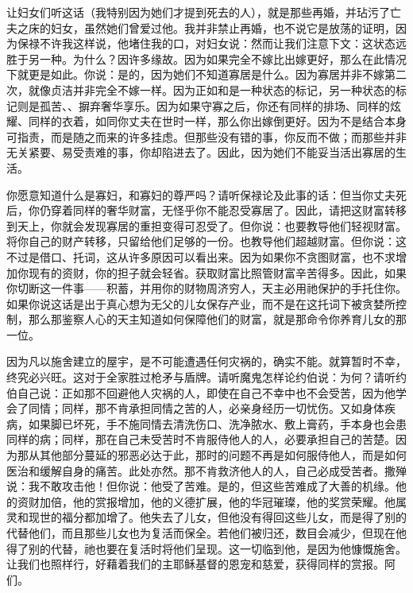 让妇女们听这话（我特别因为她们才提到死去的人），就是那些再婚，并玷污了亡夫之床的妇女，虽然她们曾爱过他。我并非禁止再婚，也不说它是放荡的证明，因为保禄不许我这样说，他堵住我的口，对妇女说：然而让我们注意下文：这状态远胜于另一种。为什么？因许多缘故。因为如果完全不嫁比出嫁更好，那么在此情况下就更是如此。你说：是的，因为她们不知道寡居是什么。因为寡居并非不嫁第二次，就像贞洁并非完全不嫁一样。因为正如和是一种状态的标记，另一种状态的标记则是孤苦、、摒弃奢华享乐。因为如果守寡之后，你还有同样的排场、同样的炫耀、同样的衣着，如同你丈夫在世时一样，那么你出嫁倒更好。因为不是结合本身可指责，而是随之而来的许多挂虑。但那些没有错的事，你反而不做；而那些并非无关紧要、易受责难的事，你却陷进去了。因此，因为她们不能妥当活出寡居的生活。\par

你愿意知道什么是寡妇，和寡妇的尊严吗？请听保禄论及此事的话：但当你丈夫死后，你仍穿着同样的奢华财富，无怪乎你不能忍受寡居了。因此，请把这财富转移到天上，你就会发现寡居的重担变得可忍受了。但你说：也要教导他们轻视财富。将你自己的财产转移，只留给他们足够的一份。也教导他们超越财富。但你说：这不过是借口、托词，这从许多原因可以看出来。因为如果你不贪图财富，也不求增加你现有的资财，你的担子就会轻省。获取财富比照管财富辛苦得多。因此，如果你切断这一件事——积蓄，并用你的财物周济穷人，天主必用祂保护的手托住你。如果你说这话是出于真心想为无父的儿女保存产业，而不是在这托词下被贪婪所控制，那么那鉴察人心的天主知道如何保障他们的财富，就是那命令你养育儿女的那一位。\par

因为凡以施舍建立的屋宇，是不可能遭遇任何灾祸的，确实不能。就算暂时不幸，终究必兴旺。这对于全家胜过枪矛与盾牌。请听魔鬼怎样论约伯说：为何？请听约伯自己说：正如那不回避他人灾祸的人，即使在自己不幸中也不会受苦，因为他学会了同情；同样，那不肯承担同情之苦的人，必亲身经历一切忧伤。又如身体疾病，如果脚已坏死，手不施同情去清洗伤口、洗净脓水、敷上膏药，手本身也会患同样的病；同样，那在自己未受苦时不肯服侍他人的人，必要承担自己的苦楚。因为那从其他部分蔓延的邪恶必达于此，那时的问题不再是如何服侍他人，而是如何医治和缓解自身的痛苦。此处亦然。那不肯救济他人的人，自己必成受苦者。撒殚说：我不敢攻击他！但你说：他受了苦难。是的，但这些苦难成了大善的机缘。他的资财加倍，他的赏报增加，他的义德扩展，他的华冠璀璨，他的奖赏荣耀。他属灵和现世的福分都加增了。他失去了儿女，但他没有得回这些儿女，而是得了别的代替他们，而且那些儿女也为复活而保全。若他们被归还，数目会减少，但现在他得了别的代替，祂也要在复活时将他们呈现。这一切临到他，是因为他慷慨施舍。让我们也照样行，好藉着我们的主耶稣基督的恩宠和慈爱，获得同样的赏报。阿们。\par

